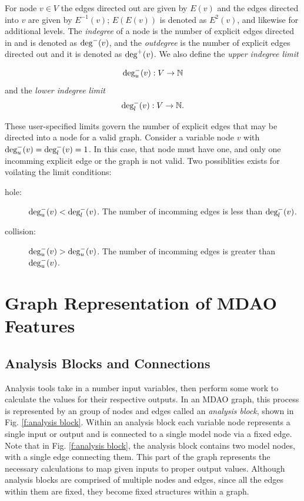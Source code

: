 For node $v \in V$ the edges directed out are given by $E(v)$ and the edges 
directed into $v$ are given by $E^{-1}(v)$; $E(E(v))$ is denoted as $E^2(v)$, 
and likewise for additional levels. The \emph{indegree} of a node is the number 
of explicit edges directed in and is denoted as $\textrm{deg}^-(v)$, and the \emph{outdegree} 
is the number of explicit edges directed out and it is denoted as $\textrm{deg}^+(v)$.
We also define the \emph{upper indegree limit} 

\begin{equation}
\textrm{deg}_u^-(v):V \to \mathbb{N}
\end{equation} 
and the \emph{lower indegree limit}
\begin{equation}
\textrm{deg}_l^-(v):V \to \mathbb{N}.
\end{equation}

These user-specified limits govern the number of explicit edges that may be directed into a 
node for a valid graph. Consider a variable node $v$ with
$\textrm{deg}_u^-(v) = \textrm{deg}_l^-(v) = 1$. In this case, that node must have one, and only one
incomming explicit edge or the graph is not valid. Two possiblities exists for voilating 
the limit conditions: 
\begin{description}
  \item[hole: ] $\textrm{deg}_u^-(v) < \textrm{deg}_l^-(v)$. The number of incomming edges 
  is less than $\textrm{deg}_l^-(v)$. 
  \item[collision: ]$\textrm{deg}_u^-(v) > \textrm{deg}_u^-(v)$. The number of incomming edges 
  is greater than $ \textrm{deg}_u^-(v)$.
\end{description} 

\section{Graph Representation of MDAO Features}

\subsection{Analysis Blocks and Connections}

Analysis tools take in a number input variables, then perform some work to calculate 
the values for their respective outputs. In an MDAO graph, this process is 
represented by an group of nodes and edges called an \emph{analysis block}, 
shown in Fig. \ref{f:analysis block}. Within an analysis block each variable 
node represents a single input or output and is connected 
to a single model node via a fixed edge. Note that in Fig. \ref{f:analysis block}, 
the analysis block contains two model nodes, with a single edge connecting them. 
This part of the graph represents the necessary calculations to map given inputs 
to proper output values. Although analysis blocks are comprised of multiple nodes and edges, since all 
the edges within them are fixed, they become fixed structures within a graph.


